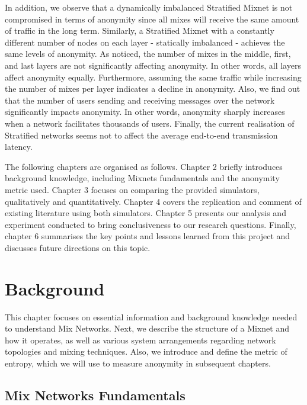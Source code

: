 \documentclass[logo,msc,cyber]{infthesis}   %
\begin{document}
In addition, we observe that a dynamically imbalanced Stratified Mixnet is not
compromised in terms of anonymity since all mixes will receive the same amount
of traffic in the long term. Similarly, a Stratified Mixnet with a constantly
different number of nodes on each layer - statically imbalanced - achieves the
same levels of anonymity. As noticed, the number of mixes in the middle, first,
and last layers are not significantly affecting anonymity. In other words, all
layers affect anonymity equally. Furthermore, assuming the same traffic while
increasing the number of mixes per layer indicates a decline in anonymity. Also,
we find out that the number of users sending and receiving messages over the
network significantly impacts anonymity. In other words, anonymity sharply
increases when a network facilitates thousands of users. Finally, the current
realisation of Stratified networks seems not to affect the average end-to-end
transmission latency.

The following chapters are organised as follows. Chapter 2 briefly introduces
background knowledge, including Mixnets fundamentals and the anonymity metric
used. Chapter 3 focuses on comparing the provided simulators, qualitatively and
quantitatively. Chapter 4 covers the replication and comment of existing
literature using both simulators. Chapter 5 presents our analysis and experiment
conducted to bring conclusiveness to our research questions. Finally, chapter 6
summarises the key points and lessons learned from this project and discusses
future directions on this topic.


\chapter{Background}
This chapter focuses on essential information and background knowledge needed to
understand Mix Networks. Next, we describe the structure of a Mixnet and how it
operates, as well as various system arrangements regarding network topologies
and mixing techniques. Also, we introduce and define the metric of entropy,
which we will use to measure anonymity in subsequent chapters.

\section{Mix Networks Fundamentals} 
\end{document}
